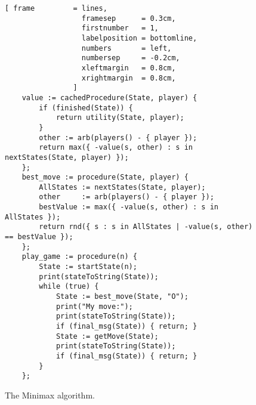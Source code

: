 \begin{figure}[!ht]
\centering
\begin{Verbatim}[ frame         = lines, 
                  framesep      = 0.3cm, 
                  firstnumber   = 1,
                  labelposition = bottomline,
                  numbers       = left,
                  numbersep     = -0.2cm,
                  xleftmargin   = 0.8cm,
                  xrightmargin  = 0.8cm,
                ]
    value := cachedProcedure(State, player) {
        if (finished(State)) {
            return utility(State, player);
        }
        other := arb(players() - { player });
        return max({ -value(s, other) : s in nextStates(State, player) });
    };
    best_move := procedure(State, player) {
        AllStates := nextStates(State, player);
        other     := arb(players() - { player });
        bestValue := max({ -value(s, other) : s in AllStates });
        return rnd({ s : s in AllStates | -value(s, other) == bestValue });
    };
    play_game := procedure(n) {
        State := startState(n);
        print(stateToString(State));
        while (true) {
            State := best_move(State, "O");
            print("My move:");
            print(stateToString(State));
            if (final_msg(State)) { return; }
            State := getMove(State);
            print(stateToString(State));
            if (final_msg(State)) { return; }
        }
    };
\end{Verbatim}
\vspace*{-0.3cm}
\caption{The Minimax algorithm.}
\label{fig:game.stlx}
\end{figure}
